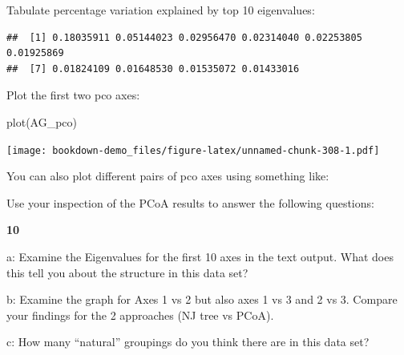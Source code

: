 \documentclass[
]{book}
\makeatletter
\newenvironment{Shaded}{\begin{snugshade}}{\end{snugshade}}
\newcommand{\DecValTok}[1]{\textcolor[rgb]{0.00,0.00,0.81}{#1}}
\newcommand{\FunctionTok}[1]{\textcolor[rgb]{0.00,0.00,0.00}{#1}}
\newcommand{\NormalTok}[1]{#1}
\newcommand{\OtherTok}[1]{\textcolor[rgb]{0.56,0.35,0.01}{#1}}
\newcommand{\SpecialCharTok}[1]{\textcolor[rgb]{0.00,0.00,0.00}{#1}}
\newenvironment{kframe}{%
\medskip{}
\setlength{\fboxsep}{.8em}
 \def\at@end@of@kframe{}%
 \ifinner\ifhmode%
  \def\at@end@of@kframe{\end{minipage}}%
  \begin{minipage}{\columnwidth}%
 \fi\fi%
 \def\FrameCommand##1{\hskip\@totalleftmargin \hskip-\fboxsep
 \colorbox{shadecolor}{##1}\hskip-\fboxsep
     \hskip-\linewidth \hskip-\@totalleftmargin \hskip\columnwidth}%
 \MakeFramed {\advance\hsize-\width
   \@totalleftmargin\z@ \linewidth\hsize
   \@setminipage}}%
 {\par\unskip\endMakeFramed%
 \at@end@of@kframe}
\newenvironment{rmdblock}[1]
  {
  \begin{itemize}
  \renewcommand{\labelitemi}{
    \raisebox{-.7\height}[0pt][0pt]{
      {\setkeys{Gin}{width=3em,keepaspectratio}\texttt{[image: images/\#1]}}
    }
  }
  \setlength{\fboxsep}{1em}
  \begin{kframe}
  \item
  }
  {
  \end{kframe}
  \end{itemize}
  }
\newenvironment{rmdquiz}
  {\begin{rmdblock}{quiz}}
  {\end{rmdblock}}
\makeatother
\begin{document}
Tabulate percentage variation explained by top 10 eigenvalues:

\begin{Shaded}
\end{Shaded}

\begin{verbatim}
##  [1] 0.18035911 0.05144023 0.02956470 0.02314040 0.02253805 0.01925869
##  [7] 0.01824109 0.01648530 0.01535072 0.01433016
\end{verbatim}

Plot the first two pco axes:

\begin{Shaded}
\begin{Highlighting}[]
\FunctionTok{plot}\NormalTok{(AG\_pco)}
\end{Highlighting}
\end{Shaded}

\texttt{[image: bookdown-demo\_files/figure-latex/unnamed-chunk-308-1.pdf]}

You can also plot different pairs of pco axes using something like:

\begin{Shaded}
\end{Shaded}

Use your inspection of the PCoA results to answer the following questions:

\begin{rmdquiz}
\textbf{10}

a: Examine the Eigenvalues for the first 10 axes in the text output. What does this tell you about the structure in this data set?

b: Examine the graph for Axes 1 vs 2 but also axes 1 vs 3 and 2 vs 3. Compare your findings for the 2 approaches (NJ tree vs PCoA).

c: How many ``natural'' groupings do you think there are in this data set?
\end{rmdquiz}
\end{document}

